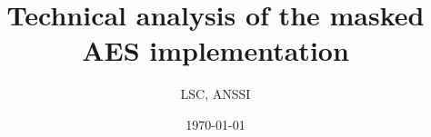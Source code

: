 \documentclass{article}
\begin{document}
\title{Technical analysis of the masked AES implementation}
\author{LSC, ANSSI}
\date{\today}

\maketitle

\tableofcontents

\newpage
















\end{document}
